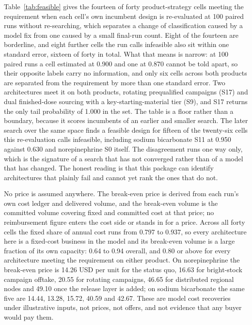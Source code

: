 Table~\ref{tab:feasible} gives the fourteen of forty product-strategy cells meeting the
requirement when each cell's own incumbent design is re-evaluated at 100 paired runs without
re-searching, which separates a change of classification caused by a model fix from one caused by
a small final-run count. Eight of the fourteen are borderline, and eight further cells the run
calls infeasible also sit within one standard error, sixteen of forty in total. What that means
is narrow: at 100 paired runs a cell estimated at 0.900 and one at 0.870 cannot be told apart, so
their opposite labels carry no information, and only six cells across both products are separated
from the requirement by more than one standard error. Two architectures meet it on both products,
rotating prequalified campaigns (S17) and dual finished-dose sourcing with a
key-starting-material tier (S9), and S17 returns the only tail probability of 1.000 in the set.
The table is a floor rather than a boundary, because it scores incumbents of an earlier and
smaller search. The later search over the same space finds a feasible design for fifteen of the
twenty-six cells this re-evaluation calls infeasible, including sodium bicarbonate S11 at 0.950
against 0.630 and norepinephrine S0 itself. The disagreement runs one way only, which is the
signature of a search that has not converged rather than of a model that has changed. The honest
reading is that this package can identify architectures that plainly fail and cannot yet rank the
ones that do not.

No price is assumed anywhere. The break-even price is derived from each run's own cost ledger and
delivered volume, and the break-even volume is the committed volume covering fixed and committed
cost at that price; no reimbursement figure enters the cost side or stands in for a price. Across
all forty cells the fixed share of annual cost runs from 0.797 to 0.937, so every architecture
here is a fixed-cost business in the model and its break-even volume is a large fraction of its
own capacity: 0.64 to 0.94 overall, and 0.80 or above for every architecture meeting the
requirement on either product. On norepinephrine the break-even price is 14.26 USD per unit for
the status quo, 16.63 for bright-stock campaign offtake, 20.55 for rotating campaigns, 46.65 for
distributed regional nodes and 49.10 once the release layer is added; on sodium bicarbonate the
same five are 14.44, 13.28, 15.72, 40.59 and 42.67. These are model cost recoveries under
illustrative inputs, not prices, not offers, and not evidence that any buyer would pay them.

